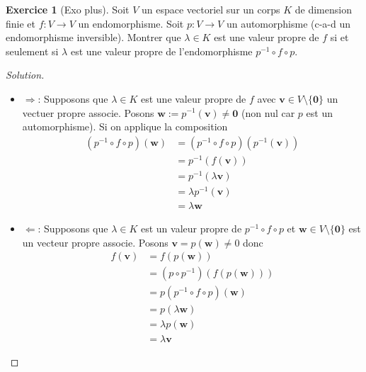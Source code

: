 \documentclass[a4paper,12pt,french]{report}
\theoremstyle{plain}
\theoremstyle{definition}
\newtheorem{exercise}{Exercice}[chapter]
\begin{document}
\begin{exercise}[Exo plus]
Soit $V$ un espace vectoriel sur un corps $K$ de dimension finie et $f:V\to V$ un endomorphisme. Soit $p:V\to V$ un automorphisme (c-a-d un endomorphisme inversible). Montrer que $\lambda \in K$ est une valeur propre de $f$ si et seulement si $\lambda$ est une valeur propre de l'endomorphisme $p ^{-1}\circ f \circ p$.
\end{exercise}
\begin{proof}[Solution]
\begin{itemize}
\item $\Rightarrow$: Supposons que $\lambda \in K$ est une valeur propre de $f$ avec $\mathbf{v}\in V\setminus \{ \mathbf{0} \}$ un vectuer propre associe. Posons $\mathbf{w}:=p ^{-1}(\mathbf{v})\neq \mathbf{0}$ (non nul car $p$ est un automorphisme). Si on applique la composition
\begin{align*}
(p ^{-1} \circ f \circ p)(\mathbf{w}) & =(p ^{-1} \circ f \circ p)(p ^{-1}(\mathbf{v})) \\
 & =p ^{-1} (f(\mathbf{v})) \\
 & = p ^{-1} (\lambda \mathbf{v}) \\
 & =\lambda p ^{-1} (\mathbf{v}) \\
 & =\lambda \mathbf{w}
\end{align*}

\item $\Leftarrow$: Supposons que $\lambda \in K$ est un valeur propre de $p ^{-1} \circ f \circ p$ et $\mathbf{w}\in V\setminus \{ \mathbf{0} \}$ est un vecteur propre associe. Posons $\mathbf{v}=p(\mathbf{w})\neq 0$ donc
\begin{align*}
f(\mathbf{v}) & =f(p(\mathbf{w})) \\
 & =(p \circ p ^{-1})(f(p(\mathbf{w}))) \\
 & =p(p ^{-1} \circ f \circ p)(\mathbf{w}) \\
 & = p(\lambda \mathbf{w}) \\  & =\lambda p(\mathbf{w})\\
 & = \lambda \mathbf{v}
\end{align*}
\end{itemize}
\end{proof}
\end{document}

